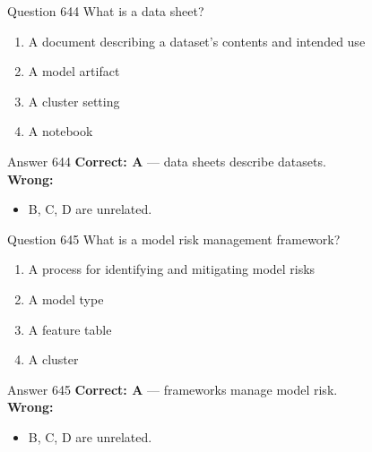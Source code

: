 \documentclass[aspectratio=169,11pt]{beamer}
\begin{document}
	\begin{frame}{Question 644}
		What is a data sheet?
		\begin{enumerate}[label=\Alph*.]
			\item A document describing a dataset's contents and intended use
			\item A model artifact
			\item A cluster setting
			\item A notebook
		\end{enumerate}
	\end{frame}
	\begin{frame}{Answer 644}
		\textbf{Correct: A} --- data sheets describe datasets.\\
		\vspace{0.5em}
		\textbf{Wrong:}
		\begin{itemize}
			\item B, C, D are unrelated.
		\end{itemize}
	\end{frame}
	
	\begin{frame}{Question 645}
		What is a model risk management framework?
		\begin{enumerate}[label=\Alph*.]
			\item A process for identifying and mitigating model risks
			\item A model type
			\item A feature table
			\item A cluster
		\end{enumerate}
	\end{frame}
	\begin{frame}{Answer 645}
		\textbf{Correct: A} --- frameworks manage model risk.\\
		\vspace{0.5em}
		\textbf{Wrong:}
		\begin{itemize}
			\item B, C, D are unrelated.
		\end{itemize}
	\end{frame}
	
\end{document}
